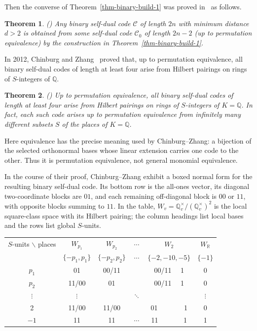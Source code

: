 \documentclass[12pt]{article}
\newtheorem{theorem}{Theorem}[section]
\begin{document}
Then the converse of Theorem~\ref{thm-binary-build-1} was proved in~\cite{Kim2001} as follows.

\begin{theorem} (\cite[Theorem 2]{Kim2001})  \label{thm-binary-build-2}
 Any binary self-dual code $\mathcal C$ of length $2n$ with minimum distance $d>2$ is obtained from some self-dual code $\mathcal C_0$ of length
$2n-2$ (up to permutation equivalence) by the construction in
Theorem~\ref{thm-binary-build-1}.
\end{theorem}

In 2012, Chinburg and Zhang~\cite{ChinburgZhang} proved that, up to
permutation equivalence, all binary self-dual codes of length at least four
arise from Hilbert pairings on rings of $S$-integers of $\mathbb Q$.

\begin{theorem}(\cite[Theorem 1.5]{ChinburgZhang})  \label{thm-binary-hilbert-2}
Up to permutation equivalence, all binary self-dual codes of length at least
four arise from Hilbert pairings on rings of $S$-integers of
$K=\mathbb Q$. In fact, each such code arises up to permutation equivalence
from infinitely many different subsets $S$ of the places of $K=\mathbb Q$.
\end{theorem}

Here equivalence has the precise meaning used by Chinburg--Zhang: a
bijection of the selected orthonormal bases whose linear extension carries
one code to the other. Thus it is permutation equivalence, not general
monomial equivalence.

In the course of their proof, Chinburg--Zhang exhibit a boxed normal form
for the resulting binary self-dual code. Its bottom row is the all-ones
vector, its diagonal two-coordinate blocks are \(01\), and each remaining
off-diagonal block is \(00\) or \(11\), with opposite blocks summing to
\(11\). In the table, \(W_v=\mathbb Q_v^\times/(\mathbb Q_v^\times)^2\)
is the local square-class space with its Hilbert pairing; the column
headings list local bases and the rows list global \(S\)-units.

\begin{center}
\begin{tabular}{|c|ccccc|}
\toprule
$S$-units $\backslash$  places & $W_{p_1}$  & $W_{p_2}$ & $\cdots$ & $W_2$  & $W_{\mathbb R}$ \\
 & $\{-p_1, p_1\}$ & $\{-p_2, p_2\}$ & $\cdots$  & $\{-2, -10, -5 \}$ & $\{-1 \}$  \\
\midrule
$p_1$  & 01   & 00/11  &  & 00/11 ~~1  &  0 \\
$p_2$  & 11/00   & 01  &  & 00/11 ~~1  &  0 \\
$\vdots$ & $\vdots$ &   &  $\ddots$ &   & $\vdots$ \\
2  & 11/00   & 11/00  &   & 01 ~~~~~~~1  &  0 \\
$-1$ & 11      & 11 & $\cdots$ & 11 ~~~~~~ 1 &  1 \\
\bottomrule
\end{tabular}
\end{center}
\end{document}
